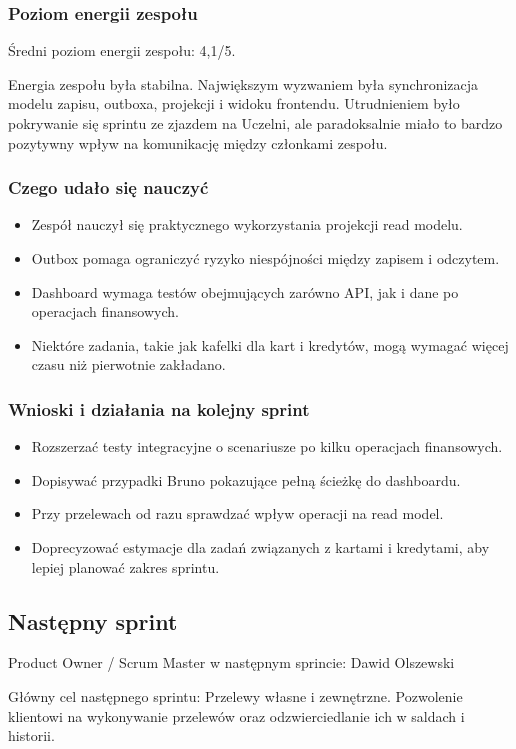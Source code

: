 \documentclass[12pt,a4paper]{article}
\begin{document}
\subsubsection*{Poziom energii zespołu}
Średni poziom energii zespołu: 4,1/5.

Energia zespołu była stabilna. Największym wyzwaniem była synchronizacja modelu zapisu, outboxa, projekcji i widoku frontendu. Utrudnieniem było pokrywanie się sprintu ze zjazdem na Uczelni, ale paradoksalnie miało to bardzo pozytywny wpływ na komunikację między członkami zespołu.

\subsubsection*{Czego udało się nauczyć}
\begin{itemize}
\item Zespół nauczył się praktycznego wykorzystania projekcji read modelu.
\item Outbox pomaga ograniczyć ryzyko niespójności między zapisem i odczytem.
\item Dashboard wymaga testów obejmujących zarówno API, jak i dane po operacjach finansowych.
\item Niektóre zadania, takie jak kafelki dla kart i kredytów, mogą wymagać więcej czasu niż pierwotnie zakładano.
\end{itemize}
\subsubsection*{Wnioski i działania na kolejny sprint}
\begin{itemize}
\item Rozszerzać testy integracyjne o scenariusze po kilku operacjach finansowych.
\item Dopisywać przypadki Bruno pokazujące pełną ścieżkę do dashboardu.
\item Przy przelewach od razu sprawdzać wpływ operacji na read model.
\item Doprecyzować estymacje dla zadań związanych z kartami i kredytami, aby lepiej planować zakres sprintu.
\end{itemize}

\subsection*{Następny sprint}
Product Owner / Scrum Master w następnym sprincie: Dawid Olszewski

Główny cel następnego sprintu: Przelewy własne i zewnętrzne. Pozwolenie klientowi na wykonywanie przelewów oraz odzwierciedlanie ich w saldach i historii.
\end{document}

